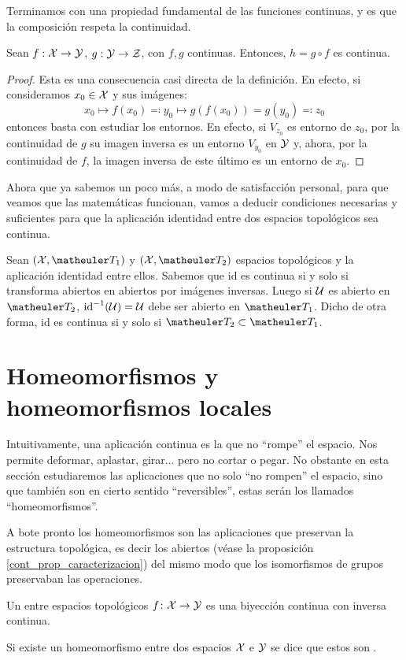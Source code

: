 Terminamos con una propiedad fundamental de las funciones continuas, y es que la composición respeta la continuidad.

\begin{prop}[Composición]
	Sean $f:\mathcal{X}\to\mathcal{Y}$, $g:\mathcal{Y}\to\mathcal{Z}$, con $f,g$ continuas. Entonces, $h = g\circ f$ es continua.
	
	\begin{proof}
		Esta es una consecuencia casi directa de la definición. En efecto, si consideramos $x_0\in\mathcal{X}$ y sus imágenes:
		\[x_0\mapsto f(x_0)\eqqcolon y_0\mapsto g(f(x_0))=g(y_0)\eqqcolon z_0\]
		entonces basta con estudiar los entornos. En efecto, si $V_{z_0}$ es entorno de $z_0$, por la continuidad de $g$ su imagen inversa es un entorno $V_{y_0}$ en $\mathcal{Y}$ y, ahora, por la continuidad de $f$, la imagen inversa de este último es un entorno de $x_0$.
	\end{proof}
\end{prop}
Ahora que ya sabemos un poco más, a modo de satisfacción personal, para que veamos que las matemáticas funcionan, vamos a deducir condiciones necesarias y suficientes para que la aplicación identidad entre dos espacios topológicos sea continua.
\begin{obs}
	\label{cont_obs_identidad}
	Sean $(\X,\T_1)$ y $(\X,\T_2)$ espacios topológicos y la aplicación identidad entre ellos. Sabemos que $\text{id}$ es continua si y solo si transforma abiertos en abiertos por imágenes inversas. Luego si $\mathcal{U}$ es abierto en $\T_2$, $\text{id}^{-1}(\mathcal{U})=\mathcal{U}$ debe ser abierto en $\T_1$. Dicho de otra forma, $\text{id}$ es continua si y solo si $\T_2\subset\T_1$.
\end{obs}
\section{Homeomorfismos y homeomorfismos locales}
\label{cont_homeomorfismos}
Intuitivamente, una aplicación continua es la que no ``rompe'' el espacio. Nos permite deformar, aplastar, girar... pero no cortar o pegar. No obstante en esta sección estudiaremos las aplicaciones que no solo ``no rompen'' el espacio, sino que también son en cierto sentido ``reversibles'', estas serán los llamados ``homeomorfismos''.

A bote pronto los homeomorfismos son las aplicaciones que preservan la estructura topológica, es decir los abiertos (véase la proposición \ref{cont_prop_caracterizacion}) del mismo modo que los isomorfismos de grupos preservaban las operaciones.
\begin{defi}[Homeomorfismo]
	\label{cont_def_homeomorfismo}
	Un  entre espacios topológicos $f\colon \mathcal{X}\rightarrow \mathcal{Y}$ es una biyección continua con inversa continua.
	
	Si existe un homeomorfismo entre dos espacios $\mathcal{X}$ e $\mathcal{Y}$ se dice que estos son .
\end{defi}

